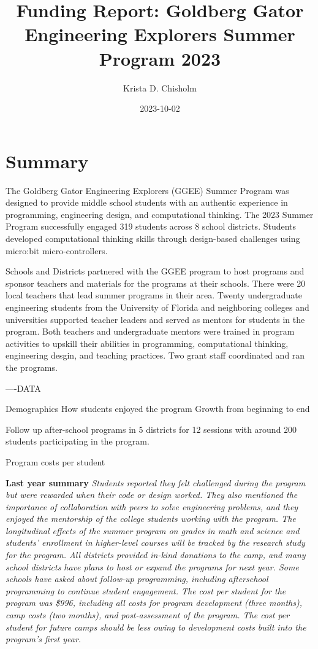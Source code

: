 \documentclass[
]{article}
\title{Funding Report: Goldberg Gator Engineering Explorers Summer
Program 2023}
\author{Krista D. Chisholm}
\date{2023-10-02}
\begin{document}
\maketitle

{
\setcounter{tocdepth}{2}
\tableofcontents
}
\hypertarget{summary}{%
\section{Summary}\label{summary}}

The Goldberg Gator Engineering Explorers (GGEE) Summer Program was
designed to provide middle school students with an authentic experience
in programming, engineering design, and computational thinking. The 2023
Summer Program successfully engaged 319 students across 8 school
districts. Students developed computational thinking skills through
design-based challenges using micro:bit micro-controllers.

Schools and Districts partnered with the GGEE program to host programs
and sponsor teachers and materials for the programs at their schools.
There were 20 local teachers that lead summer programs in their area.
Twenty undergraduate engineering students from the University of Florida
and neighboring colleges and universities supported teacher leaders and
served as mentors for students in the program. Both teachers and
undergraduate mentors were trained in program activities to upskill
their abilities in programming, computational thinking, engineering
desgin, and teaching practices. Two grant staff coordinated and ran the
programs.

----DATA

Demographics How students enjoyed the program Growth from beginning to
end

Follow up after-school programs in 5 districts for 12 sessions with
around 200 students participating in the program.

Program costs per student

\textbf{Last year summary} \emph{Students reported they felt challenged
during the program but were rewarded when their code or design worked.
They also mentioned the importance of collaboration with peers to solve
engineering problems, and they enjoyed the mentorship of the college
students working with the program. The longitudinal effects of the
summer program on grades in math and science and students' enrollment in
higher-level courses will be tracked by the research study for the
program. All districts provided in-kind donations to the camp, and many
school districts have plans to host or expand the programs for next
year. Some schools have asked about follow-up programming, including
afterschool programming to continue student engagement. The cost per
student for the program was \$996, including all costs for program
development (three months), camp costs (two months), and post-assessment
of the program. The cost per student for future camps should be less
owing to development costs built into the program's first year.}
\end{document}
